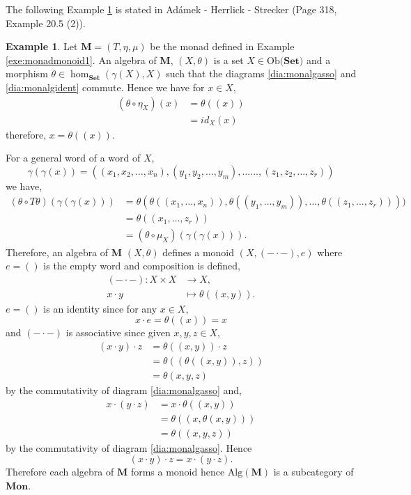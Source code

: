 \documentclass[11pt,a4paper]{article}
\theoremstyle{definition}
\newtheorem{example}[thm]{Example}
\newcommand\ho[3][]{\hom_{#1}(#2,#3)}
\newcommand\ob[1]{\mathrm{Ob(}#1\mathrm{)}}
\newcommand{\alg}[1]{\mathrm{Alg}(\mathbf{#1})}
\numberwithin{equation}{section}
\begin{document}
The following Example \ref{exe:monoidalgebras} is stated in Adámek - Herrlick - Strecker \cite{ACC} (Page 318, Example 20.5 (2)).
\begin{example}
    \label{exe:monoidalgebras}
    Let $\mathbf{M} = (T,\eta,\mu)$ be the monad defined in Example \ref{exe:monadmonoid1}. An algebra of $\mathbf{M}$, $(X,\theta)$ is a set $X\in\ob{\mathbf{Set}}$ and a morphism $\theta\in\ho[\mathbf{Set}]{\gamma(X)}{X}$ such that the diagrams \eqref{dia:monalgasso} and \eqref{dia:monalgident} commute. Hence we have for $x\in X$,
    \begin{align*}
        (\theta\circ \eta_{X})(x) &= \theta((x)) \\
        &= id_{X}(x)
    \end{align*}
    therefore, $x = \theta((x))$.
    
    For a general word of a word of $X$,
\[\gamma(\gamma(x)) = ((x_1,x_2,\dots, x_n),(y_1,y_2,\dots,y_m),\dots\dots,(z_1,z_2,\dots,z_r))\]
we have,
    \begin{align*}
            (\theta\circ T\theta)(\gamma(\gamma(x))) &= \theta(\theta((x_1,\dots,x_n)),\theta((y_1,\dots,y_m)),\dots,\theta((z_1,\dots,z_r))))\\
            &= \theta((x_1,\dots,z_r))\\
            &= (\theta\circ\mu_X)(\gamma(\gamma(x))).
    \end{align*}
    Therefore, an algebra of $\mathbf{M}$ $(X,\theta)$ defines a monoid $(X,(- \cdot -),e)$ where $e = ()$ is the empty word and composition is defined,
    \begin{align*}
        (- \cdot -) \colon X\times X &\to X,\\
        x\cdot y &\mapsto \theta((x,y)).
    \end{align*}
    $e = ()$ is an identity since for any $x\in X$,
    \[x\cdot e = \theta((x)) = x\]
    and $(- \cdot -)$ is associative since given $x,y,z\in X$,
    \begin{align*}
        (x\cdot y)\cdot z &= \theta((x,y))\cdot z \\
        &= \theta((\theta((x,y)),z))\\
        &= \theta(x,y,z)
    \end{align*}
    by the commutativity of diagram \eqref{dia:monalgasso} and,
    \begin{align*}
        x\cdot(y\cdot z) &= x\cdot\theta((x,y)) \\
        &= \theta((x,\theta(x,y))) \\
        &= \theta((x,y,z))
    \end{align*}
    by the commutativity of diagram \eqref{dia:monalgasso}. Hence 
    \[(x\cdot y)\cdot z = x\cdot(y\cdot z).\]
    Therefore each algebra of $\mathbf{M}$ forms a monoid hence $\alg{M}$ is a subcategory of $\mathbf{Mon}$.
    

\end{example}
\end{document}
